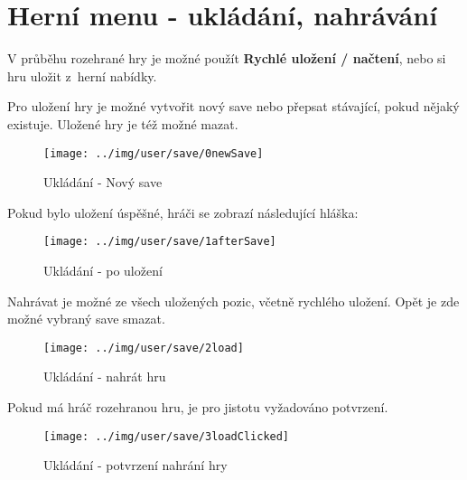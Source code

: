 
\section{Herní menu - ukládání, nahrávání}

V průběhu rozehrané hry je možné použít \textbf{Rychlé uložení / načtení}, nebo si hru uložit z~herní nabídky.

Pro uložení hry je možné vytvořit nový save nebo přepsat stávající, pokud nějaký existuje. Uložené hry je též možné mazat.

\begin{figure}[!ht]\centering
\texttt{[image: ../img/user/save/0newSave]}

\caption{Ukládání - Nový save}
\label{fig:user_save_0newSave}

\end{figure}
\FloatBarrier

Pokud bylo uložení úspěšné, hráči se zobrazí následující hláška:

\begin{figure}[!ht]\centering
\texttt{[image: ../img/user/save/1afterSave]}

\caption{Ukládání - po uložení}
\label{fig:user_save_1afterSave}

\end{figure}
\FloatBarrier

Nahrávat je možné ze všech uložených pozic, včetně rychlého uložení. Opět je zde možné vybraný save smazat.

\begin{figure}[!ht]\centering
\texttt{[image: ../img/user/save/2load]}

\caption{Ukládání - nahrát hru}
\label{fig:user_save_2load}

\end{figure}
\FloatBarrier

Pokud má hráč rozehranou hru, je pro jistotu vyžadováno potvrzení.

\begin{figure}[!ht]\centering
\texttt{[image: ../img/user/save/3loadClicked]}

\caption{Ukládání - potvrzení nahrání hry}
\label{fig:user_save_3loadClicked}

\end{figure}

\FloatBarrier